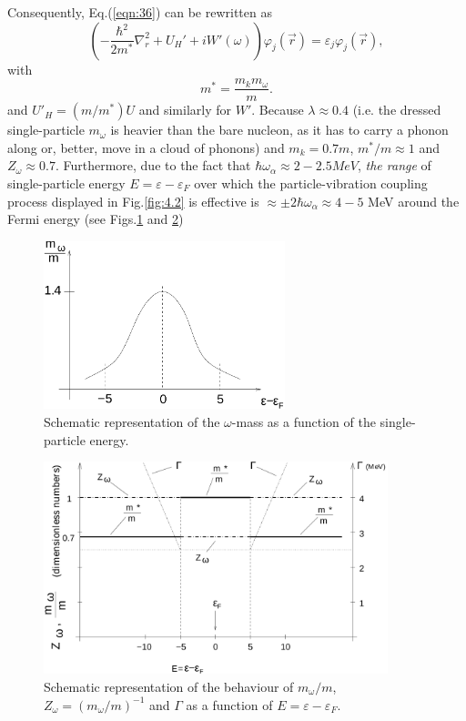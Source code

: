 Consequently, Eq.(\ref{eqn:36}) can be rewritten as
\begin{equation}
\left( - \frac{\hbar^2}{2m^*} \nabla_r^2 + U_H' + i W'(\omega) \right) \varphi_j(\vec{r}) = \varepsilon_j \varphi_j(\vec{r}),
\label{eqn:40a}
\end{equation}
with
\begin{equation}
m^* = \frac{m_k m_{\omega}}{m} .
\label{eqn:40b}
\end{equation}
 and $U'_H = (m/m^*) U$ and similarly for $W'$. Because $\lambda \approx 0.4$ (i.e. the dressed single-particle $m_{\omega}$ is heavier than the bare nucleon, as it has to carry a phonon along or, better, move in a cloud of phonons) and $m_k=0.7m$, $m^*/m \approx 1$ and $Z_{\omega} \approx 0.7$. Furthermore, due to the fact that $\hbar \omega_{\alpha} \approx 2-2.5 MeV$, {\it the range} of single-particle energy $E=\varepsilon-\varepsilon_F$ over which the particle-vibration coupling process displayed in Fig.\ref{fig:4.2} is effective is $\approx \pm 2\hbar \omega_{\alpha} \approx 4-5$ MeV around the Fermi energy (see Figs.\ref{fig:4.3} and \ref{fig:4.4})

\begin{figure}[h!]
\centerline {
\includegraphics*[width=7cm]{introduccion/figs/figintroD3}
}
\caption{Schematic representation of the $\omega$-mass as a function of the single-particle energy.}
\label{fig:4.3}
\end{figure}

\begin{figure}[h!]
\centerline {
\includegraphics*[width=10cm]{introduccion/figs/figintroD4}
}
\caption{Schematic representation of the behaviour of $m_{\omega}/m$, $Z_{\omega}=(m_{\omega}/m)^{-1}$ and $\Gamma$ as a function of $E = \varepsilon - \varepsilon_F$.}
\label{fig:4.4}
\end{figure}


